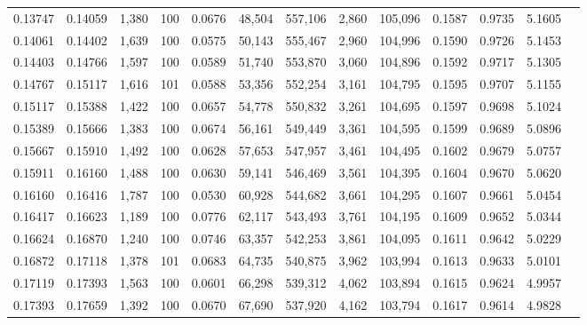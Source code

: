 \begin{tabular}{rrrrrrrrrrrrr}
0.13747 & 0.14059 & 1,380 & 100 &                                     0.0676 &  48,504 & 557,106 &   2,860 & 105,096 & 0.1587 & 0.9735 & 5.1605 \\
0.14061 & 0.14402 & 1,639 & 100 &                                     0.0575 &  50,143 & 555,467 &   2,960 & 104,996 & 0.1590 & 0.9726 & 5.1453 \\
0.14403 & 0.14766 & 1,597 & 100 &                                     0.0589 &  51,740 & 553,870 &   3,060 & 104,896 & 0.1592 & 0.9717 & 5.1305 \\
0.14767 & 0.15117 & 1,616 & 101 &                                     0.0588 &  53,356 & 552,254 &   3,161 & 104,795 & 0.1595 & 0.9707 & 5.1155 \\
0.15117 & 0.15388 & 1,422 & 100 &                                     0.0657 &  54,778 & 550,832 &   3,261 & 104,695 & 0.1597 & 0.9698 & 5.1024 \\
0.15389 & 0.15666 & 1,383 & 100 &                                     0.0674 &  56,161 & 549,449 &   3,361 & 104,595 & 0.1599 & 0.9689 & 5.0896 \\
0.15667 & 0.15910 & 1,492 & 100 &                                     0.0628 &  57,653 & 547,957 &   3,461 & 104,495 & 0.1602 & 0.9679 & 5.0757 \\
0.15911 & 0.16160 & 1,488 & 100 &                                     0.0630 &  59,141 & 546,469 &   3,561 & 104,395 & 0.1604 & 0.9670 & 5.0620 \\
0.16160 & 0.16416 & 1,787 & 100 &                                     0.0530 &  60,928 & 544,682 &   3,661 & 104,295 & 0.1607 & 0.9661 & 5.0454 \\
0.16417 & 0.16623 & 1,189 & 100 &                                     0.0776 &  62,117 & 543,493 &   3,761 & 104,195 & 0.1609 & 0.9652 & 5.0344 \\
0.16624 & 0.16870 & 1,240 & 100 &                                     0.0746 &  63,357 & 542,253 &   3,861 & 104,095 & 0.1611 & 0.9642 & 5.0229 \\
0.16872 & 0.17118 & 1,378 & 101 &                                     0.0683 &  64,735 & 540,875 &   3,962 & 103,994 & 0.1613 & 0.9633 & 5.0101 \\
0.17119 & 0.17393 & 1,563 & 100 &                                     0.0601 &  66,298 & 539,312 &   4,062 & 103,894 & 0.1615 & 0.9624 & 4.9957 \\
0.17393 & 0.17659 & 1,392 & 100 &                                     0.0670 &  67,690 & 537,920 &   4,162 & 103,794 & 0.1617 & 0.9614 & 4.9828 \\

\end{tabular}

